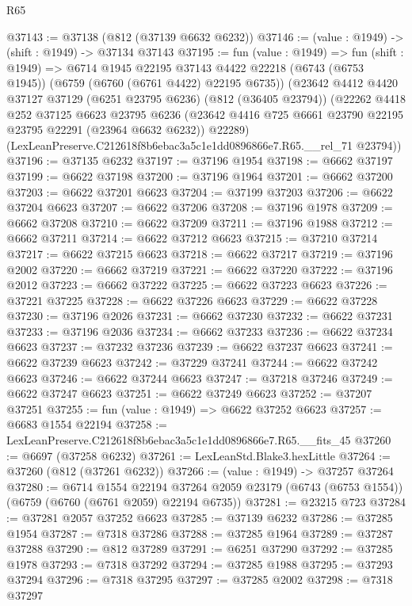 \begin{lexlean}{R65}
\begin{coremodule}
{@37143 := @37138 (@812 (@37139 @6632 @6232))
@37146 := (value : @1949) -> (shift : @1949) -> @37134 @37143
@37195 := fun (value : @1949) =>
  fun (shift : @1949) =>
  @6714
    @1945
    @22195
    @37143
    @4422
    @22218
    (@6743 (@6753 @1945))
    (@6759 (@6760 (@6761 @4422) @22195 @6735))
    (@23642
      @4412
      @4420
      @37127
      @37129
      (@6251 @23795 @6236)
      (@812 (@36405 @23794))
      (@22262
        @4418
        @252
        @37125
        @6623
        @23795
        @6236
        (@23642 @4416 @725 @6661 @23790 @22195 @23795 @22291 (@23964 @6632 @6232))
        @22289)
      (LexLeanPreserve.C212618f8b6ebac3a5c1e1dd0896866e7.R65.__rel_71 @23794))
@37196 := @37135 @6232
@37197 := @37196 @1954
@37198 := @6662 @37197
@37199 := @6622 @37198
@37200 := @37196 @1964
@37201 := @6662 @37200
@37203 := @6622 @37201 @6623
@37204 := @37199 @37203
@37206 := @6622 @37204 @6623
@37207 := @6622 @37206
@37208 := @37196 @1978
@37209 := @6662 @37208
@37210 := @6622 @37209
@37211 := @37196 @1988
@37212 := @6662 @37211
@37214 := @6622 @37212 @6623
@37215 := @37210 @37214
@37217 := @6622 @37215 @6623
@37218 := @6622 @37217
@37219 := @37196 @2002
@37220 := @6662 @37219
@37221 := @6622 @37220
@37222 := @37196 @2012
@37223 := @6662 @37222
@37225 := @6622 @37223 @6623
@37226 := @37221 @37225
@37228 := @6622 @37226 @6623
@37229 := @6622 @37228
@37230 := @37196 @2026
@37231 := @6662 @37230
@37232 := @6622 @37231
@37233 := @37196 @2036
@37234 := @6662 @37233
@37236 := @6622 @37234 @6623
@37237 := @37232 @37236
@37239 := @6622 @37237 @6623
@37241 := @6622 @37239 @6623
@37242 := @37229 @37241
@37244 := @6622 @37242 @6623
@37246 := @6622 @37244 @6623
@37247 := @37218 @37246
@37249 := @6622 @37247 @6623
@37251 := @6622 @37249 @6623
@37252 := @37207 @37251
@37255 := fun (value : @1949) => @6622 @37252 @6623
@37257 := @6683 @1554 @22194
@37258 := LexLeanPreserve.C212618f8b6ebac3a5c1e1dd0896866e7.R65.__fits_45
@37260 := @6697 (@37258 @6232)
@37261 := LexLeanStd.Blake3.hexLittle
@37264 := @37260 (@812 (@37261 @6232))
@37266 := (value : @1949) -> @37257 @37264
@37280 := @6714
    @1554
    @22194
    @37264
    @2059
    @23179
    (@6743 (@6753 @1554))
    (@6759 (@6760 (@6761 @2059) @22194 @6735))
@37281 := @23215 @723
@37284 := @37281 @2057 @37252 @6623
@37285 := @37139 @6232
@37286 := @37285 @1954
@37287 := @7318 @37286
@37288 := @37285 @1964
@37289 := @37287 @37288
@37290 := @812 @37289
@37291 := @6251 @37290
@37292 := @37285 @1978
@37293 := @7318 @37292
@37294 := @37285 @1988
@37295 := @37293 @37294
@37296 := @7318 @37295
@37297 := @37285 @2002
@37298 := @7318 @37297
}
\end{coremodule}
\end{lexlean}
